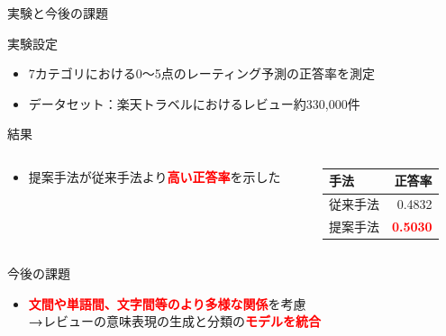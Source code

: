 \documentclass[aspectratio=43,unicode,10pt]{beamer}
\newcommand{\fire}[1]{\textcolor{red}{\textbf{#1}}}
\newcommand{\arrow}{\textcolor{ttiblue}{\textbf{→}}\hspace{1ex}}
\begin{document}
\begin{frame}{実験と今後の課題}{}
  \begin{block}{実験設定}
    \begin{itemize}
      \item 7カテゴリにおける0〜5点のレーティング予測の正答率を測定
      \item データセット：楽天トラベルにおけるレビュー約330,000件
    \end{itemize}
  \end{block}
  \begin{block}{結果}
    \begin{columns}[onlytextwidth,t]
      \begin{column}{0.6\linewidth}
        \vspace{-0.5em} %
        \begin{itemize}
          \item 提案手法が従来手法より\fire{高い正答率}を示した
        \end{itemize}
      \end{column}
      \begin{column}{0.4\linewidth}
        \vspace{-1.5em} %
        \begin{table}
          \begin{tabular}{l | r}
            手法 & 正答率 \\
            \hline
            従来手法 & 0.4832 \\
            提案手法 & \fire{0.5030} \\
          \end{tabular}
        \end{table}
      \end{column}
    \end{columns}
  \end{block}
  \vspace{-1em} %
  \begin{block}{今後の課題}
    \begin{itemize}
      \item \fire{文間や単語間、文字間等のより多様な関係}を考慮 \\
            \arrow レビューの意味表現の生成と分類の\fire{モデルを統合}
    \end{itemize}
  \end{block}
\end{frame}
\end{document}
